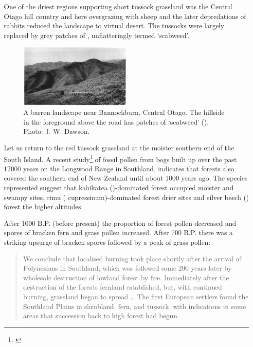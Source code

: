 One of the driest regions supporting short tussock grassland was the Central Otago hill country and here overgrazing with sheep and the later depredations of rabbits reduced the landscape to virtual desert.
The tussocks were largely replaced by grey patches of , unflatteringly termed `scabweed'.

\begin{figure}
	\includegraphics[width=0.5\textwidth]{graphics/figure86barren.jpg}
	\centering
	\caption[A barren landscape near Bannockburn]{A barren landscape near Bannockburn, Central Otago.
	The hillside in the foreground above the road has patches of `scabweed' ().
	Photo:  J. W. Dawson.}%
	\label{fig:86barren}
\end{figure}

Let us return to the red tussock grassland at the moister southern end of the South Island.
A recent study\footnote{\cite{mcglone1983vegetation}} of fossil pollen from bogs built up over the past 12000 years on the Longwood Range in Southland, indicates that forests also covered the southern end of New Zealand until about 1000 years ago.
The species represented suggest that kahikatea ()-dominated forest occupied moister and swampy sites, rimu ( cupressinum)-dominated forest drier sites and silver beech () forest the higher altitudes.

After 1000 B.P. (before present) the proportion of forest pollen decreased and spores of bracken fern and grass pollen increased.
After 700 B.P. there was a striking upsurge of bracken spores followed by a peak of grass pollen:

\begin{quote}
	We conclude that localised burning took place shortly after the arrival of Polynesians in Southland, which was followed some 200 years later by wholesale destruction of lowland forest by fire.
	Immediately after the destruction of the forests fernland established, but, with continued burning, grassland began to spread … The first European settlers found the Southland Plains in shrubland, fern, and tussock, with indications in some areas that succession back to high forest had begun.
\end{quote}

